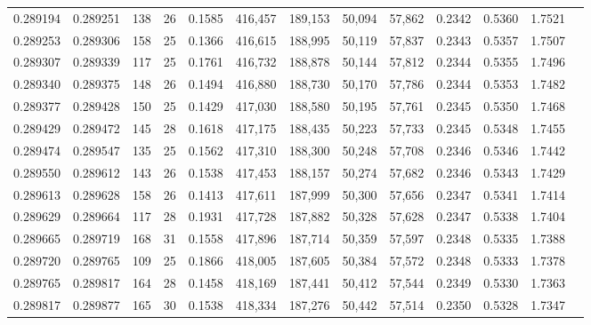 \begin{tabular}{rrrrrrrrrrrrr}
0.289194 & 0.289251 &   138 &  26 &                                     0.1585 & 416,457 & 189,153 &  50,094 &  57,862 & 0.2342 & 0.5360 & 1.7521 \\
0.289253 & 0.289306 &   158 &  25 &                                     0.1366 & 416,615 & 188,995 &  50,119 &  57,837 & 0.2343 & 0.5357 & 1.7507 \\
0.289307 & 0.289339 &   117 &  25 &                                     0.1761 & 416,732 & 188,878 &  50,144 &  57,812 & 0.2344 & 0.5355 & 1.7496 \\
0.289340 & 0.289375 &   148 &  26 &                                     0.1494 & 416,880 & 188,730 &  50,170 &  57,786 & 0.2344 & 0.5353 & 1.7482 \\
0.289377 & 0.289428 &   150 &  25 &                                     0.1429 & 417,030 & 188,580 &  50,195 &  57,761 & 0.2345 & 0.5350 & 1.7468 \\
0.289429 & 0.289472 &   145 &  28 &                                     0.1618 & 417,175 & 188,435 &  50,223 &  57,733 & 0.2345 & 0.5348 & 1.7455 \\
0.289474 & 0.289547 &   135 &  25 &                                     0.1562 & 417,310 & 188,300 &  50,248 &  57,708 & 0.2346 & 0.5346 & 1.7442 \\
0.289550 & 0.289612 &   143 &  26 &                                     0.1538 & 417,453 & 188,157 &  50,274 &  57,682 & 0.2346 & 0.5343 & 1.7429 \\
0.289613 & 0.289628 &   158 &  26 &                                     0.1413 & 417,611 & 187,999 &  50,300 &  57,656 & 0.2347 & 0.5341 & 1.7414 \\
0.289629 & 0.289664 &   117 &  28 &                                     0.1931 & 417,728 & 187,882 &  50,328 &  57,628 & 0.2347 & 0.5338 & 1.7404 \\
0.289665 & 0.289719 &   168 &  31 &                                     0.1558 & 417,896 & 187,714 &  50,359 &  57,597 & 0.2348 & 0.5335 & 1.7388 \\
0.289720 & 0.289765 &   109 &  25 &                                     0.1866 & 418,005 & 187,605 &  50,384 &  57,572 & 0.2348 & 0.5333 & 1.7378 \\
0.289765 & 0.289817 &   164 &  28 &                                     0.1458 & 418,169 & 187,441 &  50,412 &  57,544 & 0.2349 & 0.5330 & 1.7363 \\
0.289817 & 0.289877 &   165 &  30 &                                     0.1538 & 418,334 & 187,276 &  50,442 &  57,514 & 0.2350 & 0.5328 & 1.7347 \\

\end{tabular}
